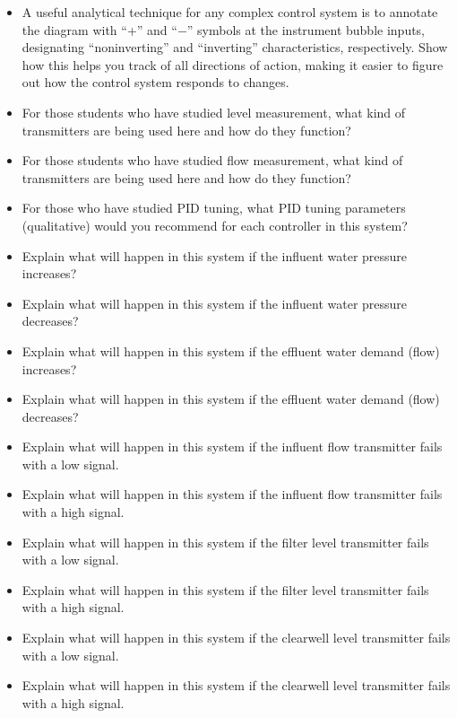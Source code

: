 \begin{itemize}
\item{} A useful analytical technique for any complex control system is to annotate the diagram with ``+'' and ``$-$'' symbols at the instrument bubble inputs, designating ``noninverting'' and ``inverting'' characteristics, respectively.  Show how this helps you track of all directions of action, making it easier to figure out how the control system responds to changes.
\item{} For those students who have studied level measurement, what kind of transmitters are being used here and how do they function?
\item{} For those students who have studied flow measurement, what kind of transmitters are being used here and how do they function?
\item{} For those who have studied PID tuning, what PID tuning parameters (qualitative) would you recommend for each controller in this system?
\item{} Explain what will happen in this system if the influent water pressure increases?
\item{} Explain what will happen in this system if the influent water pressure decreases?
\item{} Explain what will happen in this system if the effluent water demand (flow) increases?
\item{} Explain what will happen in this system if the effluent water demand (flow) decreases?
\item{} Explain what will happen in this system if the influent flow transmitter fails with a low signal.
\item{} Explain what will happen in this system if the influent flow transmitter fails with a high signal.
\item{} Explain what will happen in this system if the filter level transmitter fails with a low signal.
\item{} Explain what will happen in this system if the filter level transmitter fails with a high signal.
\item{} Explain what will happen in this system if the clearwell level transmitter fails with a low signal.
\item{} Explain what will happen in this system if the clearwell level transmitter fails with a high signal.
\end{itemize}






